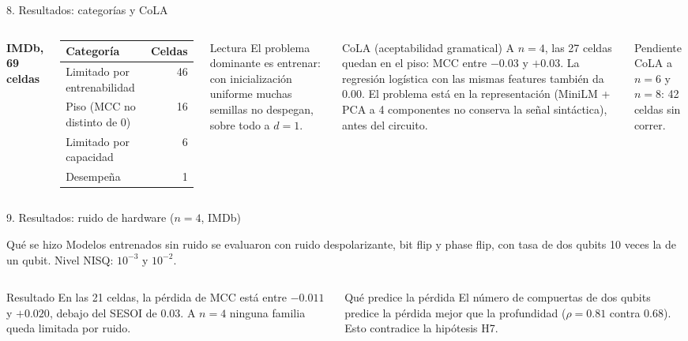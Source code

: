 \documentclass[aspectratio=169,10pt]{beamer}
\begin{document}
\begin{frame}{8. Resultados: categorías y CoLA}
\begin{columns}[T]
\small
\textbf{IMDb, 69 celdas}\\[0.3em]
\begin{tabular}{@{}lr@{}}
\toprule
Categoría & Celdas\\
\midrule
Limitado por entrenabilidad & 46\\
Piso (MCC no distinto de 0) & 16\\
Limitado por capacidad & 6\\
Desempeña & 1\\
\bottomrule
\end{tabular}
\vspace{0.5em}
\begin{azulbox}{Lectura}
El problema dominante es entrenar: con inicialización uniforme muchas semillas no despegan, sobre todo a $d=1$.
\end{azulbox}
\begin{ambarbox}{CoLA (aceptabilidad gramatical)}
A $n=4$, las 27 celdas quedan en el piso: MCC entre $-0.03$ y $+0.03$. La regresión logística con las mismas features también da 0.00. El problema está en la representación (MiniLM + PCA a 4 componentes no conserva la señal sintáctica), antes del circuito.
\end{ambarbox}
\begin{ambarbox}{Pendiente}
CoLA a $n=6$ y $n=8$: 42 celdas sin correr.
\end{ambarbox}
\end{columns}
\end{frame}

\begin{frame}{9. Resultados: ruido de hardware ($n=4$, IMDb)}
\begin{azulbox}{Qué se hizo}
Modelos entrenados sin ruido se evaluaron con ruido despolarizante, bit flip y phase flip, con tasa de dos qubits 10 veces la de un qubit. Nivel NISQ: $10^{-3}$ y $10^{-2}$.
\end{azulbox}
\begin{columns}[T]
\begin{verdebox}{Resultado}
En las 21 celdas, la pérdida de MCC está entre $-0.011$ y $+0.020$, debajo del SESOI de 0.03. A $n=4$ ninguna familia queda limitada por ruido.
\end{verdebox}
\begin{ambarbox}{Qué predice la pérdida}
El número de compuertas de dos qubits predice la pérdida mejor que la profundidad ($\rho=0.81$ contra $0.68$). Esto contradice la hipótesis H7.
\end{ambarbox}
\end{columns}
\end{frame}
\end{document}
